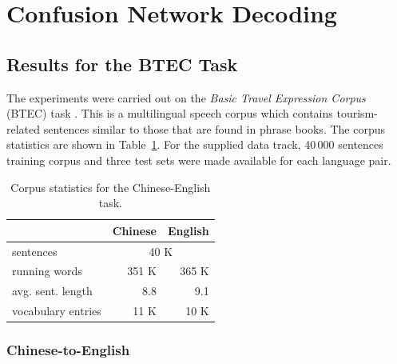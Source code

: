 \documentclass[11pt]{report}
\theoremstyle{plain}
\begin{document}
{{}  %


\section{Confusion Network Decoding}

\subsection{Results for the BTEC Task}

The experiments were carried out on the {\it Basic Travel Expression Corpus} (BTEC) task \cite{takezawa02}. 
This is a multilingual speech corpus which contains tourism-related sentences similar to those that are found in phrase books.
The corpus statistics are shown in Table~\ref{tab-corpus}.
For the supplied data track, 40\,000 sentences training corpus and three test sets were made available for each language pair.

\begin{table}
\begin{center}
\caption{Corpus statistics for the Chinese-English task.} \label{tab-corpus}
\begin{tabular}{|l|r|r|}
\hline
& Chinese & English \\
\hline
sentences & \multicolumn{2}{c|}{40 K} \\ \cline{2-3}
running words & 351 K  &  365 K \\
avg. sent. length& 8.8& 9.1 \\
vocabulary entries& 11 K & 10 K \\
\hline
\end{tabular}
\end{center}
\end{table}



\subsubsection{Chinese-to-English}

}
\end{document}
